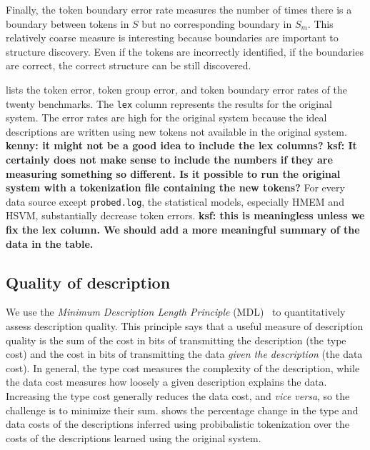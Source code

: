 Finally, the token boundary error rate measures the number of times
there is a boundary between tokens in $S$ but no corresponding
boundary in $S_m$.  This relatively coarse measure is interesting
because boundaries are important to structure discovery. Even if the
tokens are incorrectly identified, if the boundaries are correct, the
correct structure can be still discovered.

 lists the token error, token group error, and token
boundary error rates of the twenty benchmarks.  The {\tt lex} column
represents the results for the original \learnpads{} system.
The error rates are
high for the original system because the ideal \pads{} descriptions are
written using new tokens not available in the original system.
{\bf kenny: it might not be a good idea to include the lex columns?
ksf: It certainly does not make sense to include the numbers if they
are measuring something so different.  Is it possible to run the
original system with a tokenization file containing the new tokens?
}
For every data source except {\tt probed.log}, the 
statistical models, especially HMEM and HSVM, substantially decrease token errors.
{\bf ksf: this is meaningless unless we fix the lex column.  We should
add a more meaningful summary of the data in the table.}

\subsection{Quality of description}
We use the {\em Minimum Description Length Principle}
(MDL)~\cite{mdlbook} to quantitatively assess description quality.
This principle says that a useful measure of description quality is
the sum of the cost in bits of transmitting the description (the type
cost) and the cost in bits of transmitting the data \textit{given the
description} (the data cost).  In general, the type cost measures the
complexity of the description, while the data cost measures how
loosely a given description explains the data.  Increasing the type
cost generally reduces the data cost, and \textit{vice versa}, so the
challenge is to minimize their sum.
shows the percentage change in the type and data costs of the 
descriptions inferred using probibalistic tokenization over the costs
of the descriptions learned using the original \learnpads{} system.

